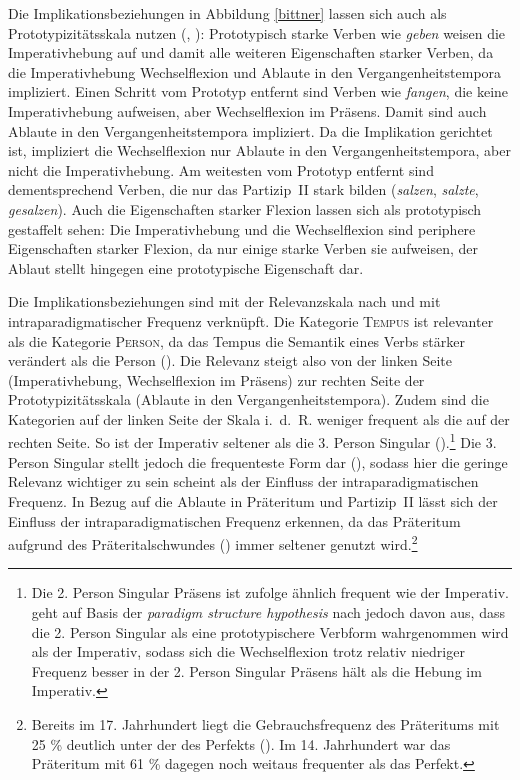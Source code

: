 Die Implikationsbeziehungen in Abbildung \ref{bittner} lassen sich auch als Prototypizitätsskala nutzen (\cite[57]{Bittner.1985}, \cite[157]{Nowak.2015}): Prototypisch starke Verben wie \textit{geben} weisen die Imperativhebung auf und damit alle weiteren Eigenschaften starker Verben, da die Imperativhebung Wechselflexion und Ablaute in den Vergangenheitstempora impliziert. Einen Schritt vom Prototyp entfernt sind Verben wie \textit{fangen}, die keine Imperativhebung aufweisen, aber Wechselflexion im Präsens. Damit sind auch Ablaute in den Vergangenheitstempora impliziert. Da die Implikation gerichtet ist, impliziert die Wechselflexion nur Ablaute in den Vergangenheitstempora, aber nicht die Imperativhebung. Am weitesten vom Prototyp entfernt sind dementsprechend Verben, die nur das Partizip~II stark bilden (\textit{salzen}, \textit{salzte}, \textit{gesalzen}). Auch die Eigenschaften starker Flexion lassen sich als prototypisch gestaffelt sehen: Die Imperativhebung und die Wechselflexion sind periphere Eigenschaften starker Flexion, da nur einige starke Verben sie aufweisen, der Ablaut stellt hingegen eine prototypische Eigenschaft dar.

Die Implikationsbeziehungen sind mit der Relevanzskala nach \textcite{Bybee.1985} und mit intraparadigmatischer Frequenz verknüpft. Die Kategorie \textsc{Tempus} ist relevanter als die Kategorie \textsc{Person}, da das Tempus die Semantik eines Verbs stärker verändert als die Person (\cite[192]{Nubling.1998}). Die Relevanz steigt also von der linken Seite (Imperativhebung, Wechselflexion im Präsens) zur rechten Seite der Prototypizitätsskala (Ablaute in den Vergangenheitstempora). Zudem sind die Kategorien auf der linken Seite der Skala i.~d.~R. weniger frequent als die auf der rechten Seite. So ist der Imperativ seltener als die 3. Person Singular (\cite[117--118]{Krause.2016}).\footnote{Die 2. Person Singular Präsens ist \textcite[117--118]{Krause.2016} zufolge ähnlich frequent wie der Imperativ. \textcite[112--113]{Krause.2016} geht auf Basis der \textit{paradigm structure hypothesis} nach \textcite[712--713]{Nesset.2010} jedoch davon aus, dass die 2. Person Singular als eine prototypischere Verbform wahrgenommen wird als der Imperativ, sodass sich die Wechselflexion trotz relativ niedriger Frequenz besser in der 2. Person Singular Präsens hält als die Hebung im Imperativ.} Die 3. Person Singular stellt jedoch die frequenteste Form dar (\cite[61]{Dammel.2011}), sodass hier die geringe Relevanz wichtiger zu sein scheint als der Einfluss der intraparadigmatischen Frequenz. In Bezug auf die Ablaute in Präteritum und Partizip~II lässt sich der Einfluss der intraparadigmatischen Frequenz erkennen, da das Präteritum aufgrund des Präteritalschwundes (\cite[311]{Solms.1984}) immer seltener genutzt wird.\footnote{Bereits im 17. Jahrhundert liegt die Gebrauchsfrequenz des Präteritums mit 25 \% deutlich unter der des Perfekts (\cite[311]{Solms.1984}). Im 14. Jahrhundert war das Präteritum mit 61 \%  dagegen noch weitaus frequenter als das Perfekt.}  



